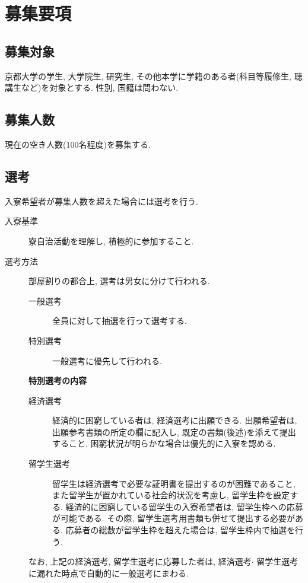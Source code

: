 \documentclass[10pt,b5jsbook,dvips,dvipdfmx,openany]{jsbook}
\theoremstyle{definition}
\begin{document}

\newpage
	\section{募集要項} \label{sec:gl}
		\subsection{募集対象}
		京都大学の学生, 大学院生, 研究生, その他本学に学籍のある者(科目等履修生, 聴講生など)を対象とする. 性別, 国籍は問わない. 
		
		\subsection{募集人数}
		現在の空き人数(100名程度)を募集する. 

		\subsection{選考}
		入寮希望者が募集人数を超えた場合には選考を行う. 
		\begin{description}
		\item[入寮基準]
		寮自治活動を理解し, 積極的に参加すること. 
		\item[選考方法]
		部屋割りの都合上, 選考は男女に分けて行われる. 
			\begin{description}
			\item[一般選考]全員に対して抽選を行って選考する. 
			\item[特別選考] 一般選考に優先して行われる. 
	\end{description}
	\begin{itembox}[l]{\bf 特別選考の内容}
	
		\begin{description}
		\item[経済選考] 経済的に困窮している者は, 経済選考に出願できる. 出願希望者は, 出願参考書類の所定の欄に記入し, 既定の書類(後述)を添えて提出すること. 困窮状況が明らかな場合は優先的に入寮を認める. 
		\item[留学生選考] 留学生は経済選考で必要な証明書を提出するのが困難であること, また留学生が置かれている社会的状況を考慮し, 留学生枠を設定する. 経済的に困窮している留学生の入寮希望者は, 留学生枠への応募が可能である. その際, 留学生選考用書類も併せて提出する必要がある. 応募者の総数が留学生枠を超えた場合は, 留学生枠内で抽選を行う.  
		\end{description}
		
なお, 上記の経済選考, 留学生選考に応募した者は, 経済選考$ \cdot $ 留学生選考に漏れた時点で自動的に一般選考にまわる. 

	\end{itembox}

	\end{description}
\end{document}
